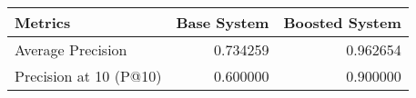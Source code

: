 \begin{tabular}{lrr}
\toprule
               Metrics &  Base System &  Boosted System \\
\midrule
     Average Precision &     0.734259 &        0.962654 \\
Precision at 10 (P@10) &     0.600000 &        0.900000 \\
\bottomrule
\end{tabular}
